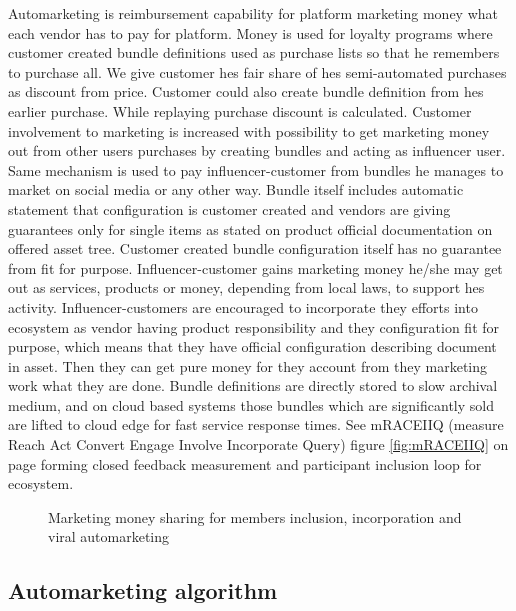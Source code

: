 Automarketing is reimbursement capability for platform marketing money what
each vendor has to pay for platform. Money is used for loyalty programs where
customer created bundle definitions used as purchase lists so that he
remembers to purchase all. We give customer hes fair share of hes
semi-automated purchases as discount from price. Customer could also create
bundle definition from hes earlier purchase. While replaying purchase discount
is calculated. Customer involvement to marketing is increased with possibility
to get marketing money out from other users purchases by creating bundles and
acting as influencer user. Same mechanism is used to pay influencer-customer
from bundles he manages to market on social media or any other way. Bundle
itself includes automatic statement that configuration is customer created and
vendors are giving guarantees only for single items as stated on product
official documentation on offered asset tree. Customer created bundle
configuration itself has no guarantee from fit for purpose.
Influencer-customer gains marketing money he/she may get out as services,
products or money, depending from local laws,  to support hes activity.
Influencer-customers are encouraged to incorporate they efforts into ecosystem
as vendor having product responsibility and they configuration fit for
purpose, which means that they have official configuration describing document
in asset. Then they can get pure money for they account from they marketing
work what they are done. Bundle definitions are directly stored to slow
archival medium, and on cloud based systems those bundles which are
significantly sold are lifted to cloud edge for fast service response times.
See mRACEIIQ (measure Reach Act Convert Engage Involve Incorporate Query)
figure \ref{fig:mRACEIIQ} on page \pageref{fig:mRACEIIQ} forming closed
feedback measurement and participant inclusion loop for ecosystem.

\begin{figure} %
 \begin{center}
  \caption{Marketing money sharing for members inclusion, incorporation and viral automarketing}
  \label{fig:automarket}
 \end{center}
\end{figure}

\subsection{Automarketing algorithm}
\label{automarketing}

